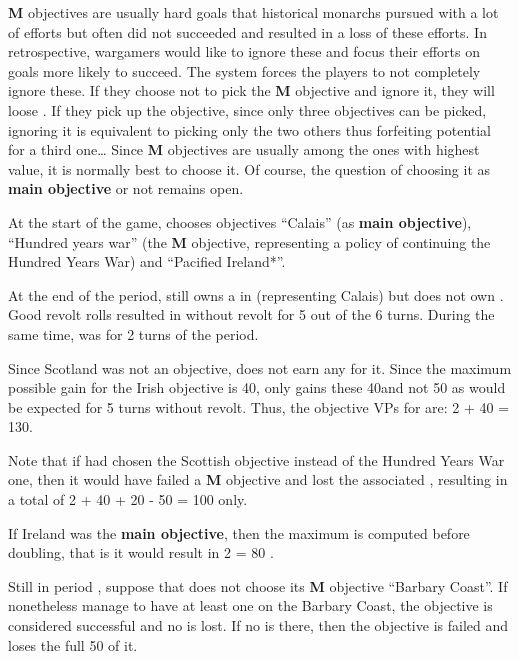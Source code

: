 \begin{designnote}
  {\bf M} objectives are usually hard goals that historical monarchs
  pursued with a lot of efforts but often did not succeeded and resulted
  in a loss of these efforts. In retrospective, wargamers would like to
  ignore these and focus their efforts on goals more likely to
  succeed. The system forces the players to not completely ignore
  these. If they choose not to pick the {\bf M} objective and ignore it,
  they will loose \VPs. If they pick up the objective, since only three
  objectives can be picked, ignoring it is equivalent to picking only
  the two others thus forfeiting potential \VPs for a third one\ldots
  Since {\bf M} objectives are usually among the ones with highest \VPs
  value, it is normally best to choose it. Of course, the question of
  choosing it as \textbf{main objective} or not remains open.
\end{designnote}

\begin{exemple}
  At the start of the game, \ANG chooses objectives ``Calais'' (as
  \textbf{main objective}), ``Hundred years war'' (the {\bf M}
  objective, representing a policy of continuing the Hundred Years War)
  and ``Pacified Ireland*''.

  At the end of the period, \ANG still owns a \Presidio in \provincePicardie
  (representing Calais) but does not own \provinceGuyenne. Good revolt rolls
  resulted in \regionIrlande without revolt for 5 out of the 6 turns. During
  the same time, \paysEcosse was \VASSAL for 2 turns of the period.

  Since Scotland was not an objective, \ANG does not earn any \VP for
  it. Since the maximum possible gain for the Irish objective is 40\VPs, \ANG
  only gains these 40\VPs and not 50 as would be expected for 5 turns without
  revolt. Thus, the objective VPs for \ANG are: 2  + 40 =
  130\VPs.

  Note that if \ANG had chosen the Scottish objective instead of the Hundred
  Years War one, then it would have failed a {\bf M} objective and lost the
  associated \VPs, resulting in a total of 2   + 40 + 20 - 50
  = 100 \VPs only.

  If Ireland was the \textbf{main objective}, then the maximum is computed
  before doubling, that is it would result in 2  = 80 \VPs.
\end{exemple}

\begin{exemple}
  Still in period , suppose that \HIS does not choose its {\bf M}
  objective ``Barbary Coast''. If \HIS nonetheless manage to have at least one
  \Presidio on the Barbary Coast, the objective is considered successful and
  no \VP is lost. If no \Presidio is there, then the objective is failed and
  \HIS loses the full 50 \VPs of it.
\end{exemple}

